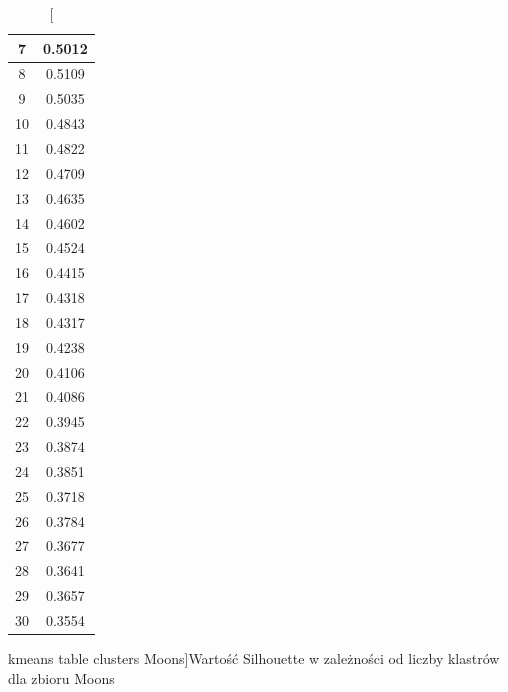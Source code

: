 \documentclass{classrep}
\begin{document}
{{\begin{table}[!htbp]
\begin{minipage}{.24\textwidth}
\begin{tabular}{|c|c|}
                        7 & 0.5012 \\ \hline
                        8 & 0.5109 \\ \hline
                        9 & 0.5035 \\ \hline
                        10 & 0.4843 \\ \hline
                        11 & 0.4822 \\ \hline
                        12 & 0.4709 \\ \hline
                        13 & 0.4635 \\ \hline
                        14 & 0.4602 \\ \hline
                        15 & 0.4524 \\ \hline
                        16 & 0.4415 \\ \hline
                        17 & 0.4318 \\ \hline
                        18 & 0.4317 \\ \hline
                        19 & 0.4238 \\ \hline
                        20 & 0.4106 \\ \hline
                        21 & 0.4086 \\ \hline
                        22 & 0.3945 \\ \hline
                        23 & 0.3874 \\ \hline
                        24 & 0.3851 \\ \hline
                        25 & 0.3718 \\ \hline
                        26 & 0.3784 \\ \hline
                        27 & 0.3677 \\ \hline
                        28 & 0.3641 \\ \hline
                        29 & 0.3657 \\ \hline
                        30 & 0.3554 \\ \hline
                    \end{tabular}
                    \caption
                    [kmeans table clusters Moons]{Wartość Silhouette w zależności od
                    liczby klastrów dla zbioru Moons}
                    \label{kmeans_table_clusters_Moons}
                \end{minipage}
                \hfill

            \end{table}
            \FloatBarrier

}}
\end{document}
